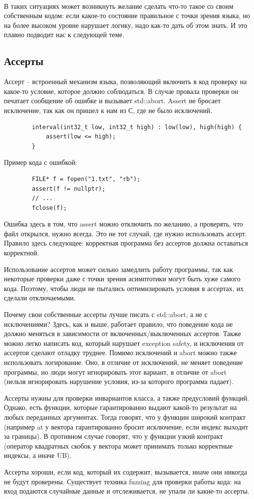 \documentclass[12pt, a4paper]{article}
\begin{document}
	\\\par В таких ситуациях может возникнуть желание сделать что-то такое со своим собственным кодом: если какое-то состояние правильное с точки зрения языка, но на более высоком уровне нарушает логику, надо как-то дать об этом знать. И это плавно подводит нас к следующей теме.
	\subsection{Ассерты}
	Ассерт -- встроенный механизм языка, позволяющий включить в код проверку на какое-то условие, которое должно соблюдаться. В случае провала проверки он печатает сообщение об ошибке и вызывает std::abort. Assert не бросает исключение, так как он пришел к нам из С, где не было исключений.
	\begin{verbatim}
		interval(int32_t low, int32_t high) : low(low), high(high) {
			assert(low <= high);
		}
	\end{verbatim}
	\par Пример кода с ошибкой:
	\begin{verbatim}
		FILE* f = fopen("1.txt", "rb");
		assert(f != nullptr);
		// ...
		fclose(f);
	\end{verbatim}
	Ошибка здесь в том, что assert можно отключить по желанию, а проверять, что файл открылся, нужно всегда. Это не тот случай, где нужно использовать ассерт. Правило здесь следующее: корректная программа без ассертов должна оставаться корректной.
	\par Использование ассертов может сильно замедлить работу программы, так как некоторые проверки даже с точки зрения асимптотики могут быть хуже самого кода. Поэтому, чтобы люди не пытались оптимизировать условия в ассертах, их сделали отключаемыми.
	\par Почему свои собственные ассерты лучше писать с std::abort, а не с исключениями? Здесь, как и выше, работает правило, что поведение кода не должно меняться в зависимости от включенных/выключенных ассертов. Также можно легко написать код, который нарушает exception safety, и исключения от ассертов сделают отладку труднее. Помимо исключений и abort можно также использовать логирование. Оно, в отличие от исключений, не меняет поведение программы, но люди могут игнорировать этот вариант, в отличие от abort (нельзя игнорировать нарушение условия, из-за которого программа падает).
	\\\par Ассерты нужны для проверки инвариантов класса, а также предусловий функций. Однако, есть функции, которые гарантированно выдают какой-то результат на любых переданных аргументах. Тогда говорят, что у функции широкий контракт (например at у вектора гарантированно бросит исключение, если индекс выходит за границы). В противном случае говорят, что у функции узкий контракт (оператор квадратных скобок у вектора может принимать только корректные индексы, а иначе UB).
	\\\par Ассерты хороши, если код, который их содержит, вызывается, иначе они никогда не будут проверены. Существует техника fuzzing для проверки работы кода: на вход подаются случайные данные и отслеживается, не упали ли какие-то ассерты.
\end{document}
